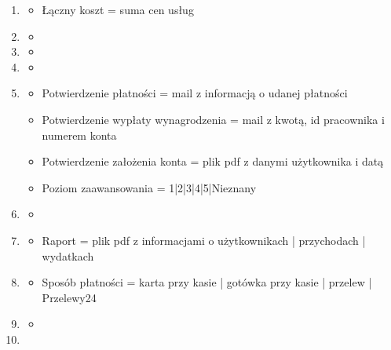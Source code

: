 \documentclass[a4paper,11pt]{article}
\begin{document}
\begin{enumerate}[label= \textbf{\Alph*}]
\begin{itemize}
\end{itemize}
\item \begin{itemize} %
    \item[]
    Łączny koszt = suma cen usług
\end{itemize}
\item \begin{itemize} %
    \item[]
\end{itemize}
\item \begin{itemize} %
    \item[]
\end{itemize}
\item \begin{itemize} %
    \item[]
\end{itemize}
\item \begin{itemize} %
    \item[]
    Potwierdzenie płatności = mail z informacją o udanej płatności
    \item[]
    Potwierdzenie wypłaty wynagrodzenia = mail z kwotą, id pracownika i numerem konta
    \item[]
    Potwierdzenie założenia konta = plik pdf z danymi użytkownika i datą
    \item[]
    Poziom zaawansowania = 1|2|3|4|5|Nieznany
\end{itemize}
\item \begin{itemize} %
    \item[]
\end{itemize}
\item \begin{itemize} %
    \item[]
    Raport = plik pdf z informacjami o użytkownikach | przychodach | wydatkach
\end{itemize}
\item \begin{itemize} %
    \item[]
    Sposób płatności = karta przy kasie | gotówka przy kasie | przelew | Przelewy24
\end{itemize}
\item \begin{itemize} %
    \item[]
\end{itemize} 
\item \begin{itemize} %

\end{itemize}
\end{enumerate}
\end{document}
